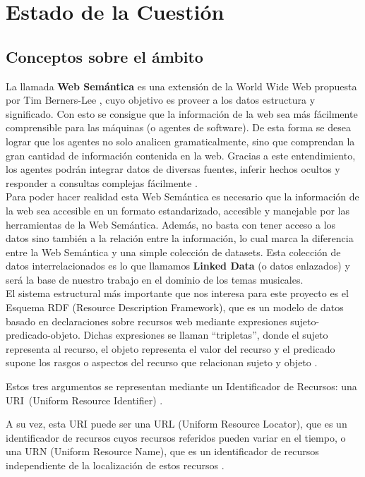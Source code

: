 \chapter{Estado de la Cuestión}
\label{cap:estadoDeLaCuestion}


\section{Conceptos sobre el ámbito}

La llamada \textbf{Web Semántica} es una extensión de la World Wide Web propuesta por Tim Berners-Lee \cite{berners2001}, cuyo objetivo es proveer a los datos estructura y significado. Con esto se consigue que la información de la web sea más fácilmente comprensible para las máquinas (o agentes de software). De esta forma se desea lograr que los agentes no solo analicen gramaticalmente, sino que comprendan la gran cantidad de información contenida en la web. Gracias a este entendimiento, los agentes podrán integrar datos de diversas fuentes, inferir hechos ocultos y responder a consultas complejas fácilmente \cite{sakr2018}.\\

Para poder hacer realidad esta Web Semántica es necesario que la información de la web sea accesible en un formato estandarizado, accesible y manejable por las herramientas de la Web Semántica. Además, no basta con tener acceso a los datos sino también a la relación entre la información, lo cual marca la diferencia entre la Web Semántica y una simple colección de datasets. Esta colección de datos interrelacionados es lo que llamamos \textbf{Linked Data} (o datos enlazados) y será la base de nuestro trabajo en el dominio de los temas musicales.\\

El sistema estructural más importante que nos interesa para este proyecto es el Esquema RDF (Resource Description Framework), que es un modelo de datos basado en declaraciones sobre recursos web mediante expresiones sujeto-predicado-objeto. Dichas expresiones se llaman “tripletas”, donde el sujeto representa al recurso, el objeto representa el valor del recurso y el predicado supone los rasgos o aspectos del recurso que relacionan sujeto y objeto \cite{sakr2018}.

Estos tres argumentos se representan mediante un Identificador de Recursos: una URI~(Uniform Resource Identifier) \cite{sakr2018,berners1998}.

A su vez, esta URI puede ser una URL (Uniform Resource Locator), que es un identificador de recursos cuyos recursos referidos pueden variar en el tiempo, o una URN (Uniform Resource Name), que es un identificador de recursos independiente de la localización de estos recursos \cite{berners1994,saint2017,sakr2018}.

